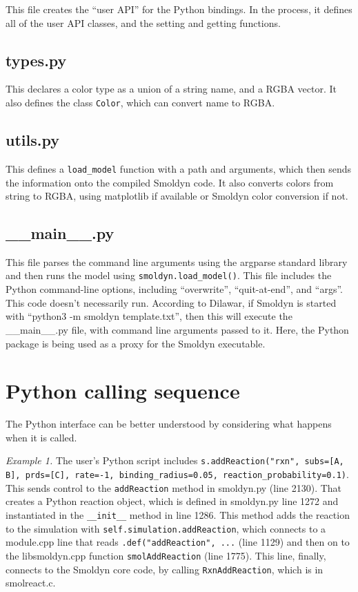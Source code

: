 \documentclass {scrbook}
\newcommand {\ttt} {\texttt}
\begin{document}
This file creates the ``user API'' for the Python bindings. In the process, it defines all of the user API classes, and the setting and getting functions.

\subsection*{types.py}

This declares a color type as a union of a string name, and a RGBA vector. It also defines the class \ttt{Color}, which can convert name to RGBA.

\subsection*{utils.py}

This defines a \ttt{load\_model} function with a path and arguments, which then sends the information onto the compiled Smoldyn code. It also converts colors from string to RGBA, using matplotlib if available or Smoldyn color conversion if not.

\subsection*{\_\_main\_\_.py}

This file parses the command line arguments using the argparse standard library and then runs the model using \ttt{smoldyn.load\_model()}. This file includes the Python command-line options, including ``overwrite'', ``quit-at-end'', and ``args''. This code doesn't necessarily run. According to Dilawar, if Smoldyn is started with ``python3 -m smoldyn template.txt'', then this will execute the \_\_main\_\_.py file, with command line arguments passed to it. Here, the Python package is being used as a proxy for the Smoldyn executable.


\section{Python calling sequence}

The Python interface can be better understood by considering what happens when it is called.

\textit{Example 1.} The user's Python script includes \ttt{s.addReaction("rxn", subs=[A, B], prds=[C], rate=-1, binding\_radius=0.05, reaction\_probability=0.1)}. This sends control to the \ttt{addReaction} method in smoldyn.py (line 2130). That creates a Python reaction object, which is defined in smoldyn.py line 1272 and instantiated in the \ttt{\_\_init\_\_} method in line 1286. This method adds the reaction to the simulation with \ttt{self.simulation.addReaction}, which connects to a module.cpp line that reads \ttt{.def("addReaction", ...} (line 1129) and then on to the libsmoldyn.cpp function \ttt{smolAddReaction} (line 1775). This line, finally, connects to the Smoldyn core code, by calling \ttt{RxnAddReaction}, which is in smolreact.c.
\end{document}
